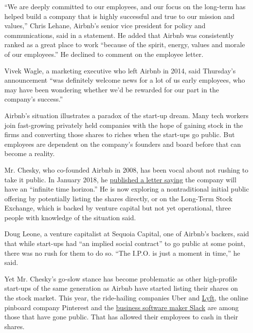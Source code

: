 ``We are deeply committed to our employees, and our focus on the
long-term has helped build a company that is highly successful and true
to our mission and values,'' Chris Lehane, Airbnb's senior vice
president for policy and communications, said in a statement. He added
that Airbnb was consistently ranked as a great place to work ``because
of the spirit, energy, values and morale of our employees.'' He declined
to comment on the employee letter.

Vivek Wagle, a marketing executive who left Airbnb in 2014, said
Thursday's announcement ``was definitely welcome news for a lot of us
early employees, who may have been wondering whether we'd be rewarded
for our part in the company's success.''

Airbnb's situation illustrates a paradox of the start-up dream. Many
tech workers join fast-growing privately held companies with the hope of
gaining stock in the firms and converting those shares to riches when
the start-ups go public. But employees are dependent on the company's
founders and board before that can become a reality.

Mr. Chesky, who co-founded Airbnb in 2008, has been vocal about not
rushing to take it public. In January 2018, he
\href{https://press.airbnb.com/brian-cheskys-open-letter-to-the-airbnb-community-about-building-a-21st-century-company/}{published
a letter saying} the company will have an ``infinite time horizon.'' He
is now exploring a nontraditional initial public offering by potentially
listing the shares directly, or on the Long-Term Stock Exchange, which
is backed by venture capital but not yet operational, three people with
knowledge of the situation said.

Doug Leone, a venture capitalist at Sequoia Capital, one of Airbnb's
backers, said that while start-ups had ``an implied social contract'' to
go public at some point, there was no rush for them to do so. ``The
I.P.O. is just a moment in time,'' he said.

Yet Mr. Chesky's go-slow stance has become problematic as other
high-profile start-ups of the same generation as Airbnb have started
listing their shares on the stock market. This year, the ride-hailing
companies Uber and
\href{https://www.nytimes3xbfgragh.onion/2019/03/29/technology/lyft-stock-price.html}{Lyft},
the online pinboard company Pinterest and the
\href{https://www.nytimes3xbfgragh.onion/2019/06/02/technology/slack-stewart-butterfield.html}{business
software maker Slack} are among those that have gone public. That has
allowed their employees to cash in their shares.


